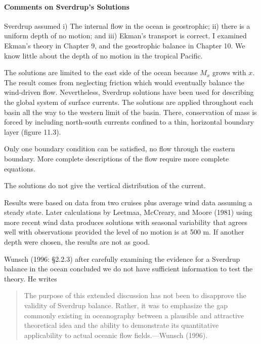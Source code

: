 \paragraph{Comments on Sverdrup's Solutions}
\begin{enumerate}
\vitem Sverdrup assumed i) The internal flow in the
ocean is geostrophic; ii) there is a uniform depth of no motion; and iii) Ekman's
transport is correct. I examined Ekman's theory in Chapter
9, and the geostrophic balance in Chapter 10. We know little about the depth of no
motion in the tropical Pacific.

\vitem The solutions are limited to the east side of the ocean because
$M_x$ grows with $x$. The result comes from neglecting friction which would
eventually balance the wind-driven flow. Nevertheless, Sverdrup solutions have
been used for describing the global system of surface currents. The solutions are
applied throughout each basin all the way to the western limit of the basin.
There, conservation of mass is forced by including north-south currents confined
to a thin, horizontal boundary layer (figure 11.3). 

\vitem Only one boundary condition can be satisfied, no flow through the eastern
boundary. More complete descriptions of the flow require more complete equations. 

\vitem The solutions do not give the vertical distribution of the
current. 

\vitem Results were based on data from two cruises plus average wind data
assuming a steady state. Later calculations by Leetmaa, McCreary, and Moore
(1981) using more recent wind data produces solutions with seasonal variability
that agrees well with observations provided the level of no motion is at 500 m. If
another depth were chosen, the results are not as good.

\vitem Wunsch (1996: \S 2.2.3) after carefully examining the evidence for a
Sverdrup balance in the ocean concluded we do not have sufficient information to
test the theory. He writes
\begin{quote} \small
The purpose of this extended discussion has not been to disapprove the validity of
Sverdrup balance. Rather, it was to emphasize the gap commonly existing in
oceanography between a plausible and attractive theoretical idea and the ability to
demonstrate its quantitative applicability to actual oceanic flow fields.---Wunsch
(1996).
\end{quote}


\end{enumerate}
